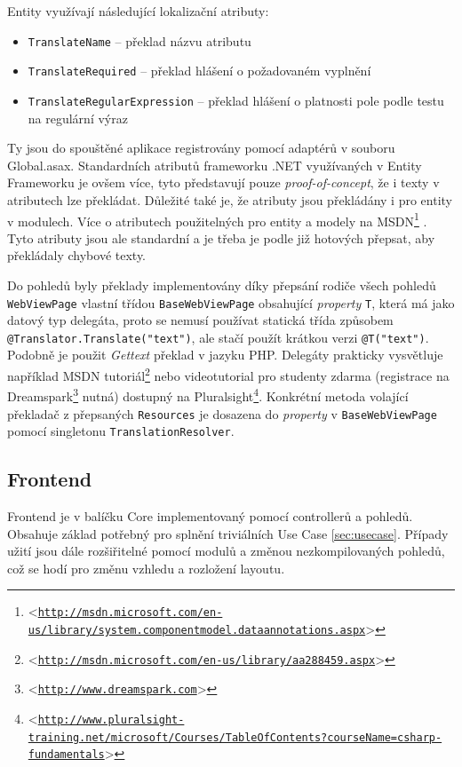 \documentclass[11pt,twoside,a4paper]{book}
\let\oldUrl\url
\renewcommand\url[1]{<\texttt{\oldUrl{#1}}>}
\begin{document}
Entity využívají následující lokalizační atributy:

\begin{itemize}
\item \texttt{TranslateName} -- překlad názvu atributu
\item \texttt{TranslateRequired} -- překlad hlášení o požadovaném vyplnění
\item \texttt{TranslateRegularExpression} -- překlad hlášení o platnosti pole podle testu na regulární výraz
\end{itemize}

Ty jsou do spouštěné aplikace registrovány pomocí adaptérů v souboru \textsf{Global.asax}. Standardních atributů frameworku .NET využívaných v Entity Frameworku je ovšem více, tyto představují pouze \textit{proof-of-concept}, že i texty v atributech lze překládat. Důležité také je, že atributy jsou překládány i pro entity v modulech. Více o atributech použitelných pro entity a modely na MSDN\footnote{\url{http://msdn.microsoft.com/en-us/library/system.componentmodel.dataannotations.aspx}} . Tyto atributy jsou ale standardní a je třeba je podle již hotových přepsat, aby překládaly chybové texty.

Do pohledů byly překlady implementovány díky přepsání rodiče všech pohledů \texttt{Web\-View\-Page} vlastní třídou \texttt{BaseWebViewPage} obsahující \textit{property} \texttt{T}, která má jako datový typ delegáta, proto se nemusí používat statická třída způsobem \texttt{@Translator.Translate("text")}, ale stačí použít krátkou verzi \texttt{@T("text")}. Podobně je použit \textit{Gettext} překlad v jazyku \textsf{PHP}. Delegáty prakticky vysvětluje například MSDN tutoriál\footnote{\url{http://msdn.microsoft.com/en-us/library/aa288459.aspx}} nebo videotutorial pro studenty zdarma (registrace na Dreamspark\footnote{\url{http://www.dreamspark.com}} nutná) dostupný na Pluralsight\footnote{\url{http://www.pluralsight-training.net/microsoft/Courses/TableOfContents?courseName=csharp-fundamentals}}.
Konkrétní metoda volající překladač z přepsaných \texttt{Resources} je dosazena do \textit{property} v \texttt{BaseWebViewPage} pomocí singletonu \texttt{TranslationResolver}.

\subsection{Frontend}

Frontend je v balíčku Core implementovaný pomocí controllerů a pohledů. Obsahuje základ potřebný pro splnění triviálních Use Case \ref{sec:usecase}. Případy užití jsou dále rozšiřitelné pomocí modulů a změnou nezkompilovaných pohledů, což se hodí pro změnu vzhledu a rozložení layoutu.
\end{document}
